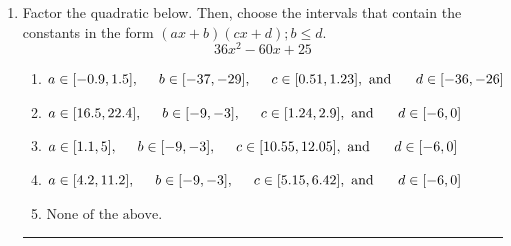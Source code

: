 \documentclass[14pt]{extbook}
\newcommand{\litem}[1]{\item#1\hspace*{-1cm}\rule{\textwidth}{0.4pt}}
\begin{document}
\begin{enumerate}
\litem{
Factor the quadratic below. Then, choose the intervals that contain the constants in the form $(ax+b)(cx+d); b \leq d.$\[ 36x^{2} -60 x + 25 \]\begin{enumerate}[label=\Alph*.]
\item \( a \in [-0.9, 1.5], \hspace*{5mm} b \in [-37, -29], \hspace*{5mm} c \in [0.51, 1.23], \text{ and } \hspace*{5mm} d \in [-36, -26] \)
\item \( a \in [16.5, 22.4], \hspace*{5mm} b \in [-9, -3], \hspace*{5mm} c \in [1.24, 2.9], \text{ and } \hspace*{5mm} d \in [-6, 0] \)
\item \( a \in [1.1, 5], \hspace*{5mm} b \in [-9, -3], \hspace*{5mm} c \in [10.55, 12.05], \text{ and } \hspace*{5mm} d \in [-6, 0] \)
\item \( a \in [4.2, 11.2], \hspace*{5mm} b \in [-9, -3], \hspace*{5mm} c \in [5.15, 6.42], \text{ and } \hspace*{5mm} d \in [-6, 0] \)
\item \( \text{None of the above.} \)


\end{enumerate}}
\end{enumerate}
\end{document}

